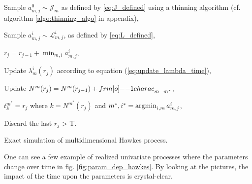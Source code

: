 \begin{algorithm}[H]
\label{algo:simul_hp_time}
\SetAlgoLined

			{ 
					{
						{Sample $a_{m,j}^0 \sim \mathcal J_{m} $ as defined by \ref{eq:J_defined} using a thinning algorithm (cf. algorithm \ref{algo:thinning_algo} in appendix),
						
							{Sample $a_{m,j}^i \sim  \mathcal L^i_{m,j} $, as defined by \ref{eq:L_defined},
							}
						}
						
						$r_j = r_{j-1} + \min_{m,i} a_{m,j}^i$,
						
							{Update $\lambda_m^i ( r_j )$ according to equation (\ref{eq:update_lambda_time}),
							
							Update $N^m ( r_j ) = N^m( r_{j-1} ) + {\11charac}_{m = m^*} $,}
					$t_k^{m^*} = r_j$ where $k = N^{m^*} ( r_j ) $ and $ m^*,i^* = \operatorname*{\arg\!\min}_{i,m} a_{m,j}^i $,
					}
			Discard the last $r_j$ > T.
			}
\caption{Exact simulation of multidimensional Hawkes process.}
\end{algorithm}


\vspace{0.5cm}

One can see a few example of realized univariate processes where the parameters change over time in fig. \ref{fig:param_dep_hawkes}. By looking at the pictures, the impact of the time upon the parameters is crystal-clear.


